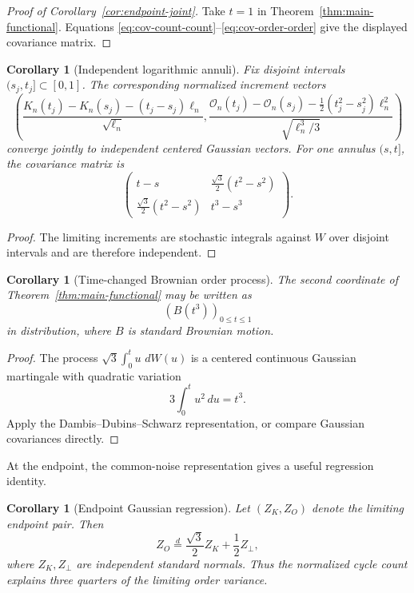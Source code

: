 \documentclass[11pt]{article}
\newtheorem{corollary}[theorem]{Corollary}
\theoremstyle{definition}
\theoremstyle{remark}
\newcommand{\dd}{\,d}
\newcommand{\cO}{\mathcal O}
\begin{document}
\begin{proof}[Proof of Corollary~\ref{cor:endpoint-joint}]
Take $t=1$ in Theorem~\ref{thm:main-functional}.  Equations
\eqref{eq:cov-count-count}--\eqref{eq:cov-order-order} give the displayed
covariance matrix.
\end{proof}

\begin{corollary}[Independent logarithmic annuli]
\label{cor:annuli}
Fix disjoint intervals $(s_j,t_j]\subset[0,1]$.  The corresponding normalized
increment vectors
\[
 \left(
 \frac{K_n(t_j)-K_n(s_j)-(t_j-s_j)\ell_n}{\sqrt{\ell_n}},
 \frac{\cO_n(t_j)-\cO_n(s_j)-\frac12(t_j^2-s_j^2)\ell_n^2}
      {\sqrt{\ell_n^3/3}}
 \right)
\]
converge jointly to independent centered Gaussian vectors.  For one annulus
$(s,t]$, the covariance matrix is
\[
 \begin{pmatrix}
 t-s&\frac{\sqrt3}{2}(t^2-s^2)\\[1mm]
 \frac{\sqrt3}{2}(t^2-s^2)&t^3-s^3
 \end{pmatrix}.
\]
\end{corollary}

\begin{proof}
The limiting increments are stochastic integrals against $W$ over disjoint
intervals and are therefore independent.
\end{proof}

\begin{corollary}[Time-changed Brownian order process]
\label{cor:time-change}
The second coordinate of Theorem~\ref{thm:main-functional} may be written as
\[
 \left(B(t^3)\right)_{0\le t\le1}
\]
in distribution, where $B$ is standard Brownian motion.
\end{corollary}

\begin{proof}
The process $\sqrt3\int_0^tu\,\dd W(u)$ is a centered continuous Gaussian
martingale with quadratic variation
\[
 3\int_0^t u^2\dd u=t^3.
\]
Apply the Dambis--Dubins--Schwarz representation, or compare Gaussian
covariances directly.
\end{proof}

At the endpoint, the common-noise representation gives a useful regression
identity.

\begin{corollary}[Endpoint Gaussian regression]
\label{cor:regression}
Let $(Z_K,Z_O)$ denote the limiting endpoint pair.  Then
\[
 Z_O\stackrel d=\frac{\sqrt3}{2}Z_K+\frac12Z_\perp,
\]
where $Z_K,Z_\perp$ are independent standard normals.  Thus the normalized
cycle count explains three quarters of the limiting order variance.
\end{corollary}
\end{document}

